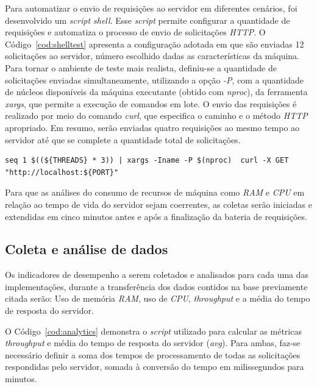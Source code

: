\documentclass[12pt]{article}
\begin{document}
Para automatizar o envio de requisições ao servidor em diferentes cenários, 
foi desenvolvido um \textit{script shell}. Esse \textit{script} permite configurar a quantidade de 
requisições e automatiza o processo de envio de solicitações \textit{HTTP}. O Código~\ref{cod:shelltest} 
apresenta a configuração adotada em que são enviadas 12 solicitações ao servidor, número escolhido dadas as características da máquina. 
Para tornar o ambiente de teste mais realista, definiu-se a quantidade de solicitações enviadas simultaneamente, 
utilizando a opção \textit{-P}, com a quantidade de núcleos disponíveis da máquina executante (obtido com \textit{nproc}), 
da ferramenta \textit{xargs}, que permite a execução de comandos em lote. O envio 
das requisições é realizado por meio do comando \textit{curl}, que especifica o caminho e o método \textit{HTTP} apropriado.
Em resumo, serão enviadas quatro requisições ao mesmo tempo ao servidor até que se complete a quantidade total de solicitações.

\begin{lstlisting}[caption={\textit{Script} para disparo de requisições}, label=cod:shelltest]
	seq 1 $((${THREADS} * 3)) | xargs -Iname -P $(nproc)  curl -X GET "http://localhost:${PORT}"
\end{lstlisting}

Para que as análises do consumo de recursos de máquina como \textit{RAM} e \textit{CPU} em relação
ao tempo de vida do servidor sejam coerrentes, as coletas serão iniciadas e extendidas em cinco 
minutos antes e após a finalização da bateria de requisições.


\subsection{Coleta e análise de dados}

Os indicadores de desempenho a serem coletados e analisados para cada uma das implementações, durante a transferência
dos dados contidos na base previamente citada serão: Uso de memória \textit{RAM}, uso de \textit{CPU}, \textit{throughput}
e a média do tempo de resposta do servidor.

O Código~\ref{cod:analytics} demonstra o \textit{script} utilizado para calcular as métricas \textit{throughput} e 
média do tempo de resposta do servidor (\textit{avg}). Para ambas, faz-se necessário definir a soma dos tempos de processamento de
todas as solicitações respondidas pelo servidor, somada à conversão do tempo em milissegundos para minutos.
\end{document}
